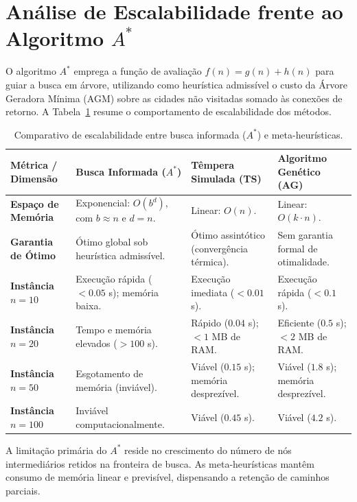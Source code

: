 \documentclass[11pt]{article}
\begin{document}
\section{Análise de Escalabilidade frente ao Algoritmo $A^*$} \label{ap:busca-classica-a-star}

O algoritmo $A^*$ emprega a função de avaliação $f(n) = g(n) + h(n)$ para guiar a busca em árvore, utilizando como heurística admissível o custo da Árvore Geradora Mínima (AGM) sobre as cidades não visitadas somado às conexões de retorno. A Tabela~\ref{tab:comparativo-a-star} resume o comportamento de escalabilidade dos métodos.

\begin{table}[H]
\centering
\caption{Comparativo de escalabilidade entre busca informada ($A^*$) e meta-heurísticas.}
\label{tab:comparativo-a-star}
\begin{tabular}{p{3.2cm}p{4.0cm}p{4.0cm}p{3.0cm}}
\toprule
\textbf{Métrica / Dimensão} & \textbf{Busca Informada ($A^*$)} & \textbf{Têmpera Simulada (TS)} & \textbf{Algoritmo Genético (AG)} \\
\midrule
\textbf{Espaço de Memória} & Exponencial: $O(b^d)$, com $b \approx n$ e $d=n$. & Linear: $O(n)$. & Linear: $O(k \cdot n)$. \\
\textbf{Garantia de Ótimo} & Ótimo global sob heurística admissível. & Ótimo assintótico (convergência térmica). & Sem garantia formal de otimalidade. \\
\textbf{Instância $n=10$} & Execução rápida ($< 0.05$ s); memória baixa. & Execução imediata ($< 0.01$ s). & Execução rápida ($< 0.1$ s). \\
\textbf{Instância $n=20$} & Tempo e memória elevados ($> 100$ s). & Rápido ($0.04$ s); $< 1$ MB de RAM. & Eficiente ($0.5$ s); $< 2$ MB de RAM. \\
\textbf{Instância $n=50$} & Esgotamento de memória (inviável). & Viável ($0.15$ s); memória desprezível. & Viável ($1.8$ s); memória desprezível. \\
\textbf{Instância $n=100$} & Inviável computacionalmente. & Viável ($0.45$ s). & Viável ($4.2$ s). \\
\bottomrule
\end{tabular}
\end{table}

A limitação primária do $A^*$ reside no crescimento do número de nós intermediários retidos na fronteira de busca. As meta-heurísticas mantêm consumo de memória linear e previsível, dispensando a retenção de caminhos parciais.
\end{document}
